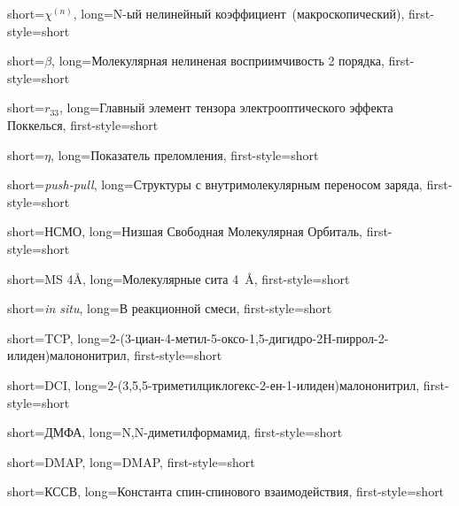 {
    short={$\chi^{(n)}$},
    long={N-ый нелинейный коэффициент~(макроскопический)},
    first-style=short
}

{
    short={$\beta$},
    long={Молекулярная нелиненая восприимчивость 2 порядка},
    first-style=short
}

{
    short={$r_{33}$},
    long={Главный элемент тензора электрооптического эффекта Поккелься},
    first-style=short
}

{
    short={$\eta$},
    long={Показатель преломления},
    first-style=short
}

{
    short={\emph{push-pull}},
    long={Структуры с внутримолекулярным переносом заряда},
    first-style=short
}

{
    short={НСМО},
    long={Низшая Свободная Молекулярная Орбиталь},
    first-style=short
}

{
    short={MS 4Å},
    long={Молекулярные сита \SI{4}{\angstrom}},
    first-style=short
}

{
    short={\emph{in situ}},
    long={В реакционной смеси},
    first-style=short
}

{
    short={TCP},
    long={2-(3-циан-4-метил-5-оксо-1,5-дигидро-2H-пиррол-2-илиден)малононитрил},
    first-style=short
}

{
    short={DCI},
    long={2-(3,5,5-триметилциклогекс-2-ен-1-илиден)малононитрил},
    first-style=short
}

{
    short={ДМФА},
    long={N,N-диметилформамид},
    first-style=short
}

{
    short={DMAP},
    long={DMAP},
    first-style=short
}

{
    short={КССВ},
    long={Константа спин-спинового взаимодействия},
    first-style=short
}

